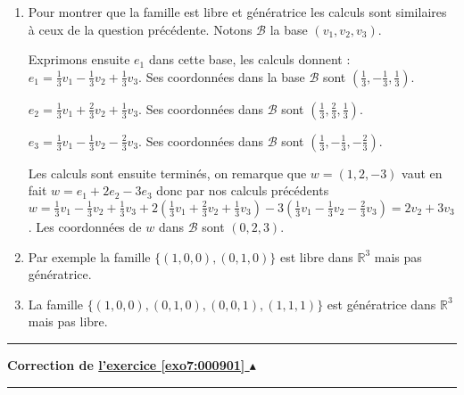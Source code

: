 \documentclass[11pt,a4paper]{article}
\newcommand{\Rr}{\mathbb{R}} \newcommand{\R}{\mathbb{R}}
\newcounter{exo}
\newcommand{\correction}[1]{\hypertarget{cor7:#1}{}\label{cor7:#1}{\bf Correction de \hyperlink{exo7:#1}{l'exercice \ref{exo7:#1} $\blacktriangle$}}\vspace{1mm}\hrule\vspace{1mm}}
\newcommand{\fincorrection}{\vspace{1mm}\hrule\vspace*{7mm}}
\begin{document}
\begin{enumerate}
\begin{enumerate}
  \end{enumerate} 


  \item Pour montrer que la famille est libre et génératrice les calculs 
sont similaires à ceux de la question précédente. Notons $\mathcal{B}$ la base $(v_1,v_2,v_3)$.

Exprimons ensuite $e_1$ dans cette base, les calculs donnent : $e_1 = \frac 13 v_1-\frac 13 v_2 +\frac 13 v_3$. 
Ses coordonnées dans la base $\mathcal{B}$ sont $(\frac13,-\frac13,\frac13)$.


$e_2 = \frac 13 v_1+\frac 23 v_2 +\frac 13 v_3$. 
Ses coordonnées dans $\mathcal{B}$ sont $(\frac13,\frac23,\frac13)$.

$e_3 = \frac 13 v_1-\frac 13 v_2 -\frac 23 v_3$. 
Ses coordonnées dans  $\mathcal{B}$ sont $(\frac13,-\frac13,-\frac23)$.


Les calculs sont ensuite terminés, on remarque que $w=(1,2,-3)$ vaut en fait
$w=e_1+2e_2-3e_3$ donc par nos calculs précédents $w=\frac 13 v_1-\frac 13 v_2 +\frac 13 v_3
+2(\frac 13 v_1+\frac 23 v_2 +\frac 13 v_3)-3(\frac 13 v_1-\frac 13 v_2 -\frac 23 v_3)
=  2v_2 +3 v_3$. Les coordonnées de $w$ dans  $\mathcal{B}$ sont $(0,2, 3)$.

  \item Par exemple la famille $\{(1,0,0),(0,1,0)\}$ est libre dans $\Rr^3$ mais pas g\'en\'eratrice.

  \item La famille  $\{(1,0,0),(0,1,0),(0,0,1),(1,1,1)\}$ est g\'en\'eratrice dans $\Rr^3$ mais pas libre.
\end{enumerate}
\fincorrection
\correction{000901}
\end{document}
